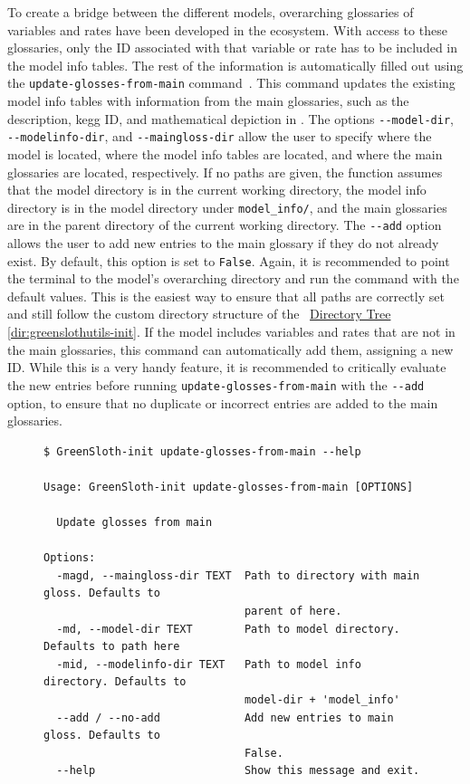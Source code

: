 To create a bridge between the different models, overarching glossaries of variables and rates have been developed in the \greensloth{} ecosystem. With access to these glossaries, only the ID associated with that variable or rate has to be included in the model info tables. The rest of the information is automatically filled out using the \verb|update-glosses-from-main| command~. This command updates the existing model info tables with information from the main glossaries, such as the description, \gls{kegg} ID, and mathematical depiction in \greensloth{}. The options \verb|--model-dir|, \verb|--modelinfo-dir|, and \verb|--maingloss-dir| allow the user to specify where the model is located, where the model info tables are located, and where the main glossaries are located, respectively. If no paths are given, the function assumes that the model directory is in the current working directory, the model info directory is in the model directory under \verb|model_info/|, and the main glossaries are in the parent directory of the current working directory. The \verb|--add| option allows the user to add new entries to the main glossary if they do not already exist. By default, this option is set to \verb|False|. Again, it is recommended to point the terminal to the model's overarching directory and run the command with the default values. This is the easiest way to ensure that all paths are correctly set and still follow the custom directory structure of the \greensloth{}~\hyperref[dir:greenslothutils-init]{Directory Tree \ref*{dir:greenslothutils-init}}. If the model includes variables and rates that are not in the main glossaries, this command can automatically add them, assigning a new ID. While this is a very handy feature, it is recommended to critically evaluate the new entries before running \verb|update-glosses-from-main| with the \verb|--add| option, to ensure that no duplicate or incorrect entries are added to the main glossaries.

\begin{figure}
\begin{lstlisting}[style=bashstyle, caption={\textbf{The update-glosses-from-main command of the CLI of \greensloth[GreenSlothUtils]}}, label={code:greenslothutils-update-glosses-from-main}]
$ GreenSloth-init update-glosses-from-main --help

Usage: GreenSloth-init update-glosses-from-main [OPTIONS]

  Update glosses from main

Options:
  -magd, --maingloss-dir TEXT  Path to directory with main gloss. Defaults to
                               parent of here.
  -md, --model-dir TEXT        Path to model directory. Defaults to path here
  -mid, --modelinfo-dir TEXT   Path to model info directory. Defaults to
                               model-dir + 'model_info'
  --add / --no-add             Add new entries to main gloss. Defaults to
                               False.
  --help                       Show this message and exit.

\end{lstlisting}
\end{figure}


